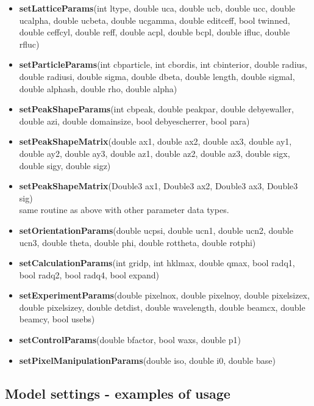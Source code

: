 \documentclass[11pt]{article} %
\begin{document}
\begin{itemize}\itemsep0pt
\item {\bf setLatticeParams}(int ltype, double uca, double ucb, double ucc,
                          double ucalpha, double ucbeta, double ucgamma,
                          double editceff, bool twinned, double ceffcyl,
                          double reff, double acpl, double bcpl,
                          double ifluc, double rfluc)
\item {\bf setParticleParams}(int cbparticle, int cbordis, int cbinterior,
                           double radius, double radiusi, double sigma,
                           double dbeta, double length, double sigmal,
                           double alphash, double rho, double alpha)
\item {\bf setPeakShapeParams}(int cbpeak, double peakpar, double debyewaller,
                            double azi, double domainsize, bool debyescherrer,
                            bool para)
\item {\bf setPeakShapeMatrix}(double ax1, double ax2, double ax3,
                            double ay1, double ay2, double ay3,
                            double az1, double az2, double az3,
                            double sigx, double sigy, double sigz)
\item {\bf setPeakShapeMatrix}(Double3 ax1, Double3 ax2, Double3 ax3, Double3 sig) \\
	same routine as above with other parameter data types.
\item {\bf setOrientationParams}(double ucpsi, double ucn1, double ucn2, double ucn3,
                              double theta, double phi, double rottheta, double rotphi)
\item {\bf setCalculationParams}(int gridp, int hklmax, double qmax, bool radq1,
                              bool radq2, bool radq4, bool expand)
\item {\bf setExperimentParams}(double pixelnox, double pixelnoy, double pixelsizex,
                             double pixelsizey, double detdist, double wavelength,
                             double beamcx, double beamcy, bool usebs)
\item {\bf setControlParams}(double bfactor, bool waxs, double p1)
\item {\bf setPixelManipulationParams}(double iso, double i0, double base)
\end{itemize}


\subsection{Model settings - examples of usage}
\end{document}
